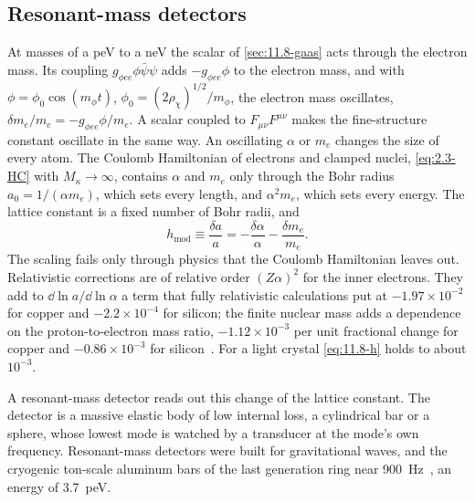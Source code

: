 \subsection{Resonant-mass detectors}\label{sec:11.8-mass}

At masses of a peV to a neV the scalar of \cref{sec:11.8-gaas} acts through the electron mass. Its coupling $g_{\phi ee}\phi\bar\psi\psi$ adds $-g_{\phi ee}\phi$ to the electron mass, and with $\phi = \phi_0\cos(m_\phi t)$, $\phi_0 = (2\rho_\chi)^{1/2}/m_\phi$, the electron mass oscillates, $\delta m_e/m_e = -g_{\phi ee}\phi/m_e$. A scalar coupled to $F_{\mu\nu}F^{\mu\nu}$ makes the fine-structure constant oscillate in the same way. An oscillating $\alpha$ or $m_e$ changes the size of every atom. The Coulomb Hamiltonian of electrons and clamped nuclei, \cref{eq:2.3-HC} with $M_\kappa \to \infty$, contains $\alpha$ and $m_e$ only through the Bohr radius $a_0 = 1/(\alpha m_e)$, which sets every length, and $\alpha^2m_e$, which sets every energy. The lattice constant is a fixed number of Bohr radii, and
\begin{equation}
  h_{\mathrm{mod}} \equiv \frac{\delta a}{a} = -\frac{\delta\alpha}{\alpha} - \frac{\delta m_e}{m_e} .
  \label{eq:11.8-h}
\end{equation}
The scaling fails only through physics that the Coulomb Hamiltonian leaves out. Relativistic corrections are of relative order $(Z\alpha)^2$ for the inner electrons. They add to $\dd\ln a/\dd\ln\alpha$ a term that fully relativistic calculations put at $-1.97\times10^{-2}$ for copper and $-2.2\times10^{-4}$ for silicon; the finite nuclear mass adds a dependence on the proton-to-electron mass ratio, $-1.12\times10^{-3}$ per unit fractional change for copper and $-0.86\times10^{-3}$ for silicon~\cite[Table~II]{pasteka2019material}. For a light crystal \cref{eq:11.8-h} holds to about $10^{-3}$.

A resonant-mass detector reads out this change of the lattice constant. The detector is a massive elastic body of low internal loss, a cylindrical bar or a sphere, whose lowest mode is watched by a transducer at the mode's own frequency. Resonant-mass detectors were built for gravitational waves, and the cryogenic ton-scale aluminum bars of the last generation ring near \SI{900}{Hz}~\cite{arvanitaki2016sound}, an energy of \SI{3.7}{peV}.

